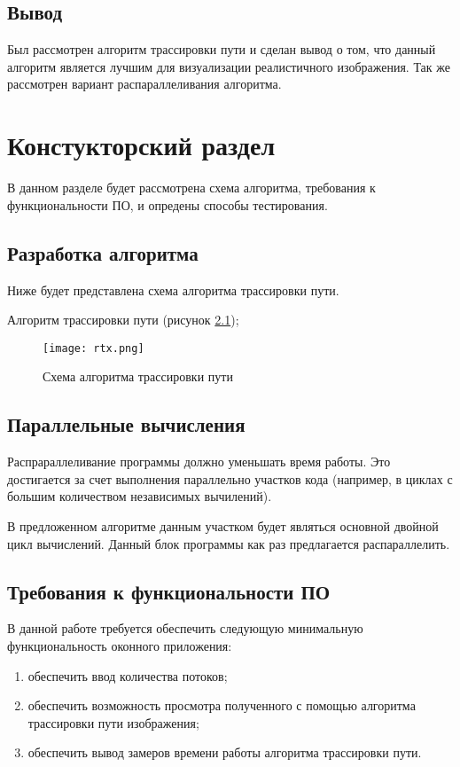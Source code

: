 \documentclass[utf8x, 12pt]{G7-32}
\begin{document}
\section{Вывод}
Был рассмотрен алгоритм трассировки пути и сделан вывод о том, что данный алгоритм является лучшим для визуализации реалистичного изображения. Так же рассмотрен вариант распараллеливания алгоритма.


\chapter{ Констукторский раздел}
\label{cha:design}
    В данном разделе будет рассмотрена схема алгоритма, требования к функциональности ПО,
    и опредены способы тестирования.
    
    \section{Разработка алгоритма}
        Ниже будет представлена схема алгоритма трассировки пути.

        Алгоритм трассировки пути (рисунок \ref{schema:rtx});


    \begin{figure}[h!]
        \centering
            \texttt{[image: rtx.png]}
            \caption{Схема алгоритма трассировки пути}
            \label{schema:rtx}
    \end{figure}

    \section{Параллельные вычисления}
Распрараллеливание программы должно уменьшать время работы. Это достигается за счет выполнения параллельно участков кода (например, в циклах с большим количеством независимых вычилений).

В предложенном алгоритме данным участком будет являться основной двойной цикл вычислений.
Данный блок программы как раз предлагается распараллелить.


    \section{Требования к функциональности ПО}
        В данной работе требуется обеспечить следующую минимальную функциональность оконного приложения:
        \begin{enumerate}
	\item обеспечить ввод количества потоков;
            \item обеспечить возможность просмотра полученного с помощью алгоритма трассировки пути изображения;
            \item обеспечить вывод замеров времени работы алгоритма трассировки пути.
        \end{enumerate}
\end{document}
